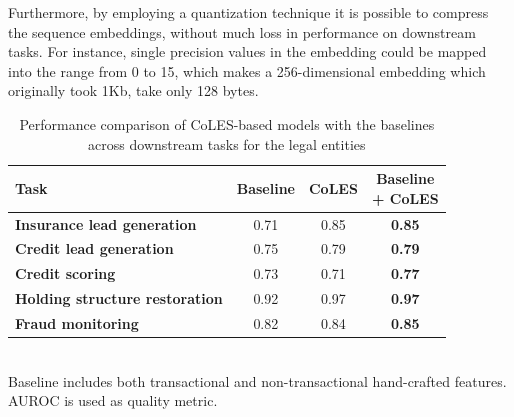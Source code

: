 \documentclass[sigconf, anonymous]{acmart}
\newcommand{\attn}[1]{{\color{cyan}{\textbf{#1}}}}
\begin{document}
Furthermore, by employing a quantization technique it is possible to compress
the sequence embeddings, without much loss in performance on downstream tasks.
% 
For instance, single precision values in the embedding could be mapped into
the range from 0 to 15, which makes a 256-dimensional embedding which originally
took 1Kb, take only 128 bytes.
%
% 


\begin{table}
    \centering
    \caption{
        Performance comparison of CoLES-based models with the baselines across downstream
        tasks for the legal entities
    }
    \begin{tabularx}{\linewidth}{Xccc}
        \toprule
            \textbf{Task}
            & \textbf{Baseline }
            & \textbf{CoLES}
            & \makecell{\textbf{Baseline} \\ \textbf{+ CoLES}}
            \\ 
        \midrule
            \textbf{Insurance lead generation} & 0.71 & 0.85 & \textbf{0.85} \\
            \textbf{Credit lead generation} & 0.75 & 0.79 & \textbf{0.79} \\
            \textbf{Credit scoring} & 0.73 & 0.71 & \textbf{0.77} \\
            \textbf{Holding structure restoration} & 0.92 & 0.97 & \textbf{0.97} \\
            \textbf{Fraud monitoring} & 0.82 & 0.84 & \textbf{0.85} \\
        \bottomrule
    \end{tabularx}%
    \\
    \small{
        Baseline includes both transactional and non-transactional hand-crafted
        features. AUROC is used as quality metric.
    }
    \label{tab-internal-company}
\end{table}
\end{document}
